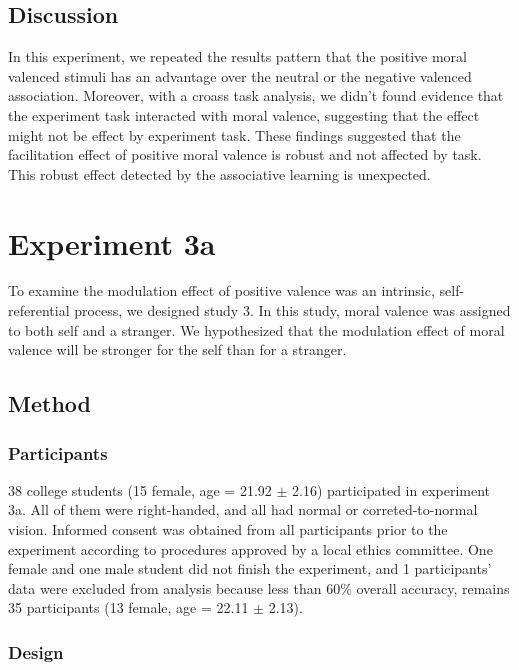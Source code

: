 \documentclass[man]{apa6}
\begin{document}
\hypertarget{discussion-2}{%
\subsection{Discussion}\label{discussion-2}}

In this experiment, we repeated the results pattern that the positive moral valenced stimuli has an advantage over the neutral or the negative valenced association. Moreover, with a croass task analysis, we didn't found evidence that the experiment task interacted with moral valence, suggesting that the effect might not be effect by experiment task.
These findings suggested that the facilitation effect of positive moral valence is robust and not affected by task. This robust effect detected by the associative learning is unexpected.

\hypertarget{experiment-3a}{%
\section{Experiment 3a}\label{experiment-3a}}

To examine the modulation effect of positive valence was an intrinsic, self-referential process, we designed study 3. In this study, moral valence was assigned to both self and a stranger. We hypothesized that the modulation effect of moral valence will be stronger for the self than for a stranger.

\hypertarget{method-3}{%
\subsection{Method}\label{method-3}}

\hypertarget{participants-4}{%
\subsubsection{Participants}\label{participants-4}}

38 college students (15 female, age = 21.92 \(\pm\) 2.16) participated in experiment 3a. All of them were right-handed, and all had normal or correted-to-normal vision. Informed consent was obtained from all participants prior to the experiment according to procedures approved by a local ethics committee. One female and one male student did not finish the experiment, and 1 participants' data were excluded from analysis because less than 60\% overall accuracy, remains 35 participants (13 female, age = 22.11 \(\pm\) 2.13).

\hypertarget{design}{%
\subsubsection{Design}\label{design}}
\end{document}
